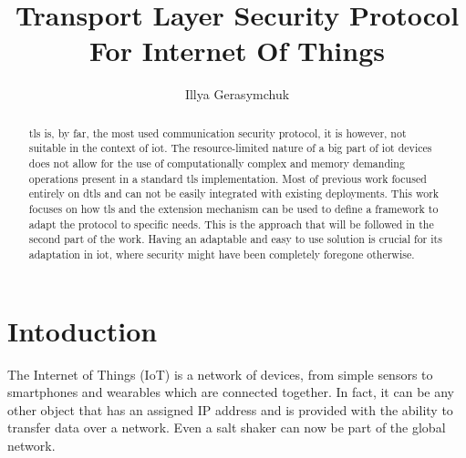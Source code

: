 \documentclass{llncs}
\begin{document}
%
\frontmatter          %
%
\pagestyle{headings}  %
%

\tableofcontents
\newpage

\mainmatter              %
%
\title{Transport Layer Security Protocol For Internet Of Things}
%
%
\author{{Illya Gerasymchuk} \\
}
%
%
%
\maketitle              %

\begin{abstract}
\gls{tls} is, by far, the most used communication security protocol, it is however, not suitable in the context of \gls{iot}. The resource-limited nature
of a big part of \gls{iot} devices does not allow for the use of computationally complex
and memory demanding operations present in a standard \gls{tls} implementation. Most of previous work focused entirely on \gls{dtls} and
can not be easily integrated with existing deployments. This work focuses on
how \gls{tls} and the extension mechanism can be used to define a framework
to adapt the protocol to specific needs. This is the approach that
will be followed in the second part of the work. Having an adaptable and
easy to use solution is crucial for its adaptation in \gls{iot},
where security might have been completely foregone otherwise.

\end{abstract}
%
\section{Intoduction}
%

The Internet of Things (IoT) is a network of devices, from simple sensors to smartphones and wearables
which are connected together. In fact, it can be any other object that has an assigned
IP address and is provided with the ability to transfer data over a network. Even a salt shaker\cite{SMALTThe76:online} can now be part of the global network.
\end{document}
